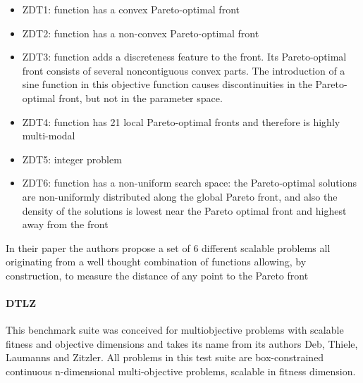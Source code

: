    \begin{itemize}
        \item ZDT1: function has a convex Pareto-optimal front
        \item ZDT2: function has a non-convex Pareto-optimal front
        \item ZDT3: function adds a discreteness feature to the front. Its Pareto-optimal front consists of several noncontiguous convex parts. The introduction of a sine function in this objective function causes discontinuities in the Pareto-optimal front, but not in the parameter space.
        \item ZDT4: function has 21 local Pareto-optimal fronts and therefore is highly multi-modal
        \item ZDT5: integer problem
        \item ZDT6: function has a non-uniform search space: the Pareto-optimal solutions are non-uniformly distributed along the global Pareto front, and also the density of the solutions is lowest near the Pareto optimal front and highest away from the front
    \end{itemize}

    In their paper the authors propose a set of 6 different scalable problems all originating from a well thought combination of functions allowing, by construction, to measure the distance of any point to the Pareto front

    \paragraph{DTLZ}
    This benchmark suite\cite{DebTLZ05} was conceived for multiobjective problems with scalable fitness and objective dimensions and takes its name from its authors Deb, Thiele, Laumanns and Zitzler. All problems in this test suite are box-constrained continuous n-dimensional multi-objective problems, scalable in fitness dimension.

